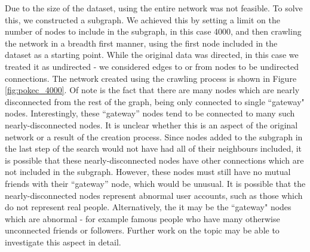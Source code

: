 \documentclass[bsc,frontabs,twoside,singlespacing,parskip,deptreport]{infthesis}     %
\begin{document}
Due to the size of the dataset, using the entire network was not feasible. To solve this, we constructed a subgraph. We achieved this by setting a limit on the number of nodes to include in the subgraph, in this case 4000, and then crawling the network in a breadth first manner, using the first node included in the dataset as a starting point. While the original data was directed, in this case we treated it as undirected - we considered edges to or from nodes to be undirected connections. The network created using the crawling process is shown in Figure \ref{fig:pokec_4000}. Of note is the fact that there are many nodes which are nearly disconnected from the rest of the graph, being only connected to single ``gateway" nodes. Interestingly, these ``gateway'' nodes tend to be connected to many such nearly-disconnected nodes. It is unclear whether this is an aspect of the original network or a result of the creation process. Since nodes added to the subgraph in the last step of the search would not have had all of their neighbours included, it is possible that these nearly-disconnected nodes have other connections which are not included in the subgraph. However, these nodes must still have no mutual friends with their ``gateway'' node, which would be unusual. It is possible that the nearly-disconnected nodes represent abnormal user accounts, such as those which do not represent real people. Alternatively, the it may be the ``gateway" nodes which are abnormal - for example famous people who have many otherwise unconnected friends or followers. Further work on the topic may be able to investigate this aspect in detail.
\end{document}
